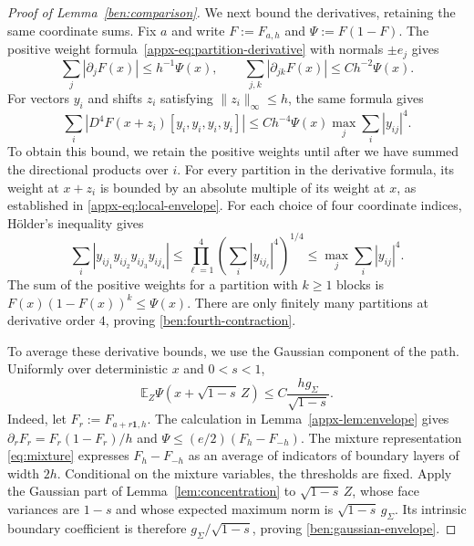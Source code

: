 \documentclass[11pt,letterpaper]{article}
\theoremstyle{remark}
\newcommand{\E}{\mathbb E}
\begin{document}
\begin{proof}[Proof of Lemma~\ref{ben:comparison}]
We next bound the derivatives, retaining the same coordinate sums.
Fix $a$ and write $F:=F_{a,h}$ and $\Psi:=F(1-F)$.
The positive weight formula~\eqref{appx-eq:partition-derivative}
with normals $\pm e_j$ gives
\[
 \sum_j|\partial_jF(x)|\le h^{-1}\Psi(x),\qquad
 \sum_{j,k}|\partial_{jk}F(x)|\le Ch^{-2}\Psi(x).
\]
For vectors $y_i$ and shifts $z_i$ satisfying
$\|z_i\|_\infty\le h$, the same formula gives
\begin{equation}\label{ben:fourth-contraction}
 \sum_i|D^4F(x+z_i)[y_i,y_i,y_i,y_i]|
 \le Ch^{-4}\Psi(x)\max_j\sum_i|y_{ij}|^4.
\end{equation}
To obtain this bound, we retain the positive weights until after
we have summed the directional products over $i$. For every partition in the
derivative formula, its weight at $x+z_i$ is bounded by an
absolute multiple of its weight at $x$, as established in
\eqref{appx-eq:local-envelope}. For each choice of four coordinate
indices, H\"older's inequality gives
\[
 \sum_i|y_{ij_1}y_{ij_2}y_{ij_3}y_{ij_4}|
 \le\prod_{\ell=1}^4
       \left(\sum_i|y_{ij_\ell}|^4\right)^{1/4}
 \le\max_j\sum_i|y_{ij}|^4.
\]
The sum of the positive weights for a partition with $k\ge1$
blocks is $F(x)(1-F(x))^k\le\Psi(x)$. There are only finitely
many partitions at derivative order $4$, proving
\eqref{ben:fourth-contraction}.

To average these derivative bounds, we use the Gaussian component
of the path. Uniformly over deterministic $x$ and $0<s<1$,
\begin{equation}\label{ben:gaussian-envelope}
 \E_Z\Psi(x+\sqrt{1-s}\,Z)
 \le C\frac{hg_\Sigma}{\sqrt{1-s}}.
\end{equation}
Indeed, let $F_r:=F_{a+r\mathbf1,h}$. The calculation in
Lemma~\ref{appx-lem:envelope} gives
$\partial_rF_r=F_r(1-F_r)/h$ and
$\Psi\le(e/2)(F_h-F_{-h})$. The mixture representation
\eqref{eq:mixture} expresses $F_h-F_{-h}$ as an average of
indicators of boundary layers of width $2h$. Conditional on the
mixture variables, the thresholds are fixed. Apply the Gaussian
part of Lemma~\ref{lem:concentration} to $\sqrt{1-s}\,Z$,
whose face variances are $1-s$ and whose expected maximum norm
is $\sqrt{1-s}\,g_\Sigma$. Its intrinsic boundary coefficient
is therefore $g_\Sigma/\sqrt{1-s}$, proving
\eqref{ben:gaussian-envelope}.


\end{proof}
\end{document}

